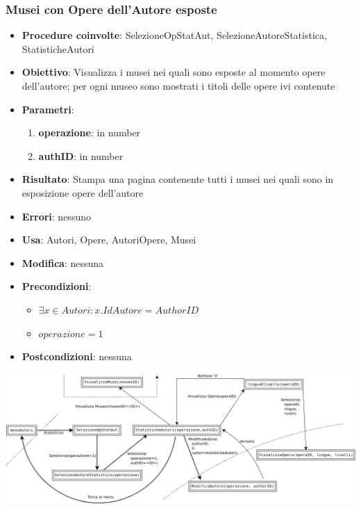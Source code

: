 \subsubsection{Musei con Opere dell’Autore esposte}
\label{MuseiOpereEsposte}
\begin{itemize}
	\item \textbf{Procedure coinvolte}: SelezioneOpStatAut, SelezioneAutoreStatistica, StatisticheAutori
	\item \textbf{Obiettivo}: Visualizza i musei nei quali sono esposte al momento opere dell'autore; per ogni museo sono mostrati i titoli delle opere ivi contenute
	\item \textbf{Parametri}:
	\begin{enumerate}
		\item \textbf{operazione}: in number
		\item \textbf{authID}: in number
	\end{enumerate}
	\item \textbf{Risultato}: Stampa una pagina contenente tutti i musei nei quali sono in esposizione opere dell'autore
	\item \textbf{Errori}: nessuno
	\item \textbf{Usa}: Autori, Opere, AutoriOpere, Musei
	\item \textbf{Modifica}: nessuna
	\item \textbf{Precondizioni}:
	\begin{itemize}
		\item $\exists x \in Autori : x.IdAutore = AuthorID$
		\item $operazione  = 1$
	\end{itemize}
	\item \textbf{Postcondizioni}: nessuna
\end{itemize}
\includegraphics[width=\textwidth]{img/statAutori-1.png}\\[1cm]

